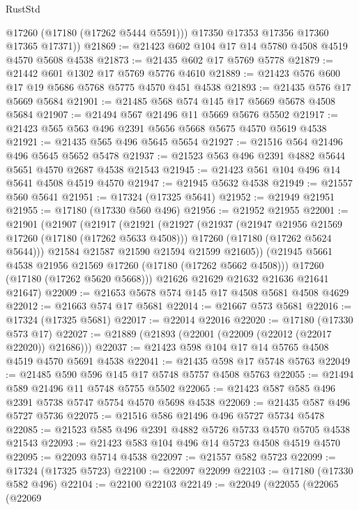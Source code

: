 \begin{lexlean}{RustStd}
\begin{coremodule}
{\begin{coremodule}
{{{{{{{{{{{{{{{{{{{{{{{{{{{{{{{{{{{{{{{{{{{{{{{{{{{{{{{          @17260
          (@17180 (@17262 @5444 @5591)))
        @17350
        @17353
        @17356
        @17360
        @17365
        @17371))
@21869 := @21423 @602 @104 @17 @14 @5780 @4508 @4519 @4570 @5608 @4538
@21873 := @21435 @602 @17 @5769 @5778
@21879 := @21442 @601 @1302 @17 @5769 @5776 @4610
@21889 := @21423 @576 @600 @17 @19 @5686 @5768 @5775 @4570 @451 @4538
@21893 := @21435 @576 @17 @5669 @5684
@21901 := @21485 @568 @574 @145 @17 @5669 @5678 @4508 @5684
@21907 := @21494 @567 @21496 @11 @5669 @5676 @5502
@21917 := @21423 @565 @563 @496 @2391 @5656 @5668 @5675 @4570 @5619 @4538
@21921 := @21435 @565 @496 @5645 @5654
@21927 := @21516 @564 @21496 @496 @5645 @5652 @5478
@21937 := @21523 @563 @496 @2391 @4882 @5644 @5651 @4570 @2687 @4538 @21543
@21945 := @21423 @561 @104 @496 @14 @5641 @4508 @4519 @4570
@21947 := @21945 @5632 @4538
@21949 := @21557 @560 @5641
@21951 := @17324 (@17325 @5641)
@21952 := @21949 @21951
@21955 := @17180 (@17330 @560 @496)
@21956 := @21952 @21955
@22001 := @21901
    (@21907
      (@21917
        (@21921
          (@21927
            (@21937
              (@21947 @21956 @21569 @17260 (@17180 (@17262 @5633 @4508)))
              @17260
              (@17180 (@17262 @5624 @5644)))
            @21584
            @21587
            @21590
            @21594
            @21599
            @21605))
        (@21945 @5661 @4538 @21956 @21569 @17260 (@17180 (@17262 @5662 @4508)))
        @17260
        (@17180 (@17262 @5620 @5668)))
      @21626
      @21629
      @21632
      @21636
      @21641
      @21647)
@22009 := @21653 @5678 @574 @145 @17 @4508 @5681 @4508 @4629
@22012 := @21663 @574 @17 @5681
@22014 := @21667 @573 @5681
@22016 := @17324 (@17325 @5681)
@22017 := @22014 @22016
@22020 := @17180 (@17330 @573 @17)
@22027 := @21889 (@21893 (@22001 (@22009 (@22012 (@22017 @22020)) @21686)))
@22037 := @21423 @598 @104 @17 @14 @5765 @4508 @4519 @4570 @5691 @4538
@22041 := @21435 @598 @17 @5748 @5763
@22049 := @21485 @590 @596 @145 @17 @5748 @5757 @4508 @5763
@22055 := @21494 @589 @21496 @11 @5748 @5755 @5502
@22065 := @21423 @587 @585 @496 @2391 @5738 @5747 @5754 @4570 @5698 @4538
@22069 := @21435 @587 @496 @5727 @5736
@22075 := @21516 @586 @21496 @496 @5727 @5734 @5478
@22085 := @21523 @585 @496 @2391 @4882 @5726 @5733 @4570 @5705 @4538 @21543
@22093 := @21423 @583 @104 @496 @14 @5723 @4508 @4519 @4570
@22095 := @22093 @5714 @4538
@22097 := @21557 @582 @5723
@22099 := @17324 (@17325 @5723)
@22100 := @22097 @22099
@22103 := @17180 (@17330 @582 @496)
@22104 := @22100 @22103
@22149 := @22049
    (@22055
      (@22065
        (@22069
}}}}}}}}}}}}}}}}}}}}}}}}}}}}}}}}}}}}}}}}}}}}}}}}}}}}}}}
\end{coremodule}}
\end{coremodule}
\end{lexlean}
